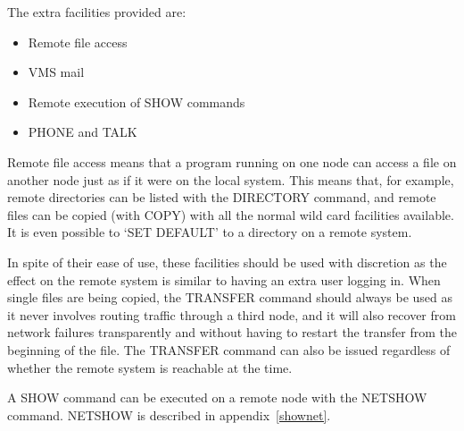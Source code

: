 The extra facilities provided are:
\begin{itemize}
\item Remote file access
\item VMS mail
\item Remote execution of SHOW commands
\item PHONE and TALK
\end{itemize}
Remote file access means that a program running on one node can access a file on
another node just as if it were on the local system.
This means that, for example, remote directories can be listed with the
DIRECTORY command, and remote files can be copied (with COPY) with all the
normal wild card facilities available.
It is even possible to `SET DEFAULT' to a directory on a remote system.

In spite of their ease of use, these facilities should be used with discretion
as the effect on the remote system is similar to having an extra user logging
in.
When single files are being copied, the TRANSFER command should always be used
as it never involves routing traffic through a third node, and it will also
recover from network failures transparently and without having to restart the
transfer from the beginning of the file.
The TRANSFER command can also be issued regardless of whether the remote system
is reachable at the time.

A SHOW command can be executed on a remote node with the NETSHOW command.
NETSHOW is described in appendix~\ref{shownet}.

